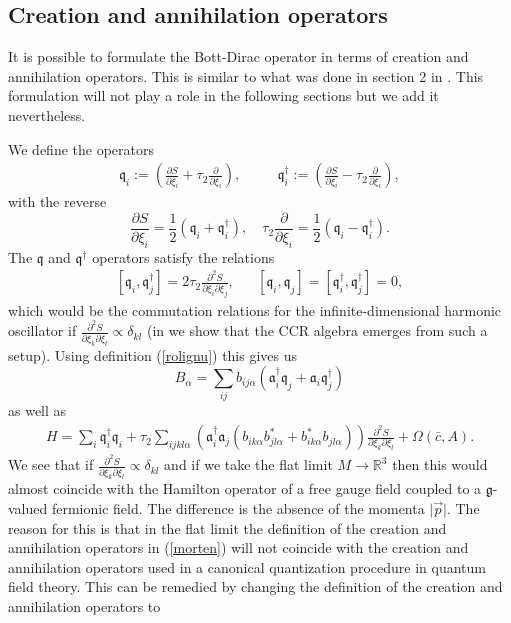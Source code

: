 \documentclass[letterpaper,11pt]{article}
\def\a{\alpha}
\def\d{\delta}
\def\OO{\Omega}
\newcommand{\pa}{\partial}
\begin{document}
\subsection{Creation and annihilation operators}


It is possible to formulate the Bott-Dirac operator in terms of creation and annihilation operators. This is similar to what was done in section 2 in \cite{Aastrup:2017atr}. This formulation will not play a role in the following sections but we add it nevertheless. 

We define the operators 
\begin{eqnarray}
\mathfrak{q}_i := \left( \frac{\pa S}{\pa \xi_i}+ \tau_2  \frac{\pa}{\pa\xi_i}\right)  , &&\quad
\mathfrak{q}_i^\dagger :=  \left( \frac{\pa S}{\pa \xi_i} -\tau_2 \frac{\pa}{\pa\xi_i} \right) ,
\label{morten}
\end{eqnarray}
with the reverse
$$
 \frac{\pa S}{\pa \xi_i} =  \frac{1}{2}  (\mathfrak{q}_i +\mathfrak{q}_i^\dagger ) ,   \quad    \tau_2 \frac{\pa}{\pa\xi_i} =\frac{1}{2}  (\mathfrak{q}_i -\mathfrak{q}_i^\dagger ).
$$
The $\mathfrak{q}$ and $\mathfrak{q}^\dagger$ operators satisfy the relations  
\begin{eqnarray}
\left[\mathfrak{q}_i , \mathfrak{q}_j^\dagger \right] =  {2\tau_2} \frac{\pa^2 S}{\pa\xi_i \pa \xi_j} ,
&&
\left[\mathfrak{q}_i  , \mathfrak{q}_j\right] =  \left[\mathfrak{q}_i^\dagger  , \mathfrak{q}_j^\dagger\right] =   0,
\label{covi}
\end{eqnarray}
which would be the commutation relations for the infinite-dimensional harmonic oscillator if $ \frac{\pa^2 S}{\pa\xi_k \pa \xi_l}\propto \d_{kl}$ (in \cite{Aastrup:2017atr} we show that the CCR algebra emerges from such a setup). 
Using definition (\ref{rolignu}) this gives us
$$
B_\a =  \sum_{ij} b_{ij\a} \left(  \mathfrak{a}_i^\dagger  \mathfrak{q}_j +   \mathfrak{a}_i \mathfrak{q}_j^\dagger   \right)
$$
as well as 
\begin{eqnarray}
H= 
 \sum_{i} \mathfrak{q}_i^\dagger   \mathfrak{q}_i 
 +{\tau_2}\sum_{ijkl\a}  \left( \mathfrak{a}_i^\dagger  \mathfrak{a}_j  \left( b_{ik\a}b^*_{jl\a}  +b^*_{ik\a}b_{jl\a}   \right)    \right) \frac{\pa^2 S}{\pa\xi_k \pa \xi_l} +  \OO(\bar{c}, A)  .
\label{tja}
\end{eqnarray}
We see that if $\frac{\pa^2 S}{\pa\xi_k \pa \xi_l}  \propto \d_{kl}$ and if we take the flat limit $M\rightarrow \mathbb{R}^3$ then this would almost coincide with the Hamilton operator of a free gauge field coupled to a $\mathfrak{g}$-valued fermionic field. The difference is the absence of the momenta $\vert \vec{p} \vert$. The reason for this is that in the flat limit the definition of the creation and annihilation operators in (\ref{morten}) will not coincide with the creation and annihilation operators used in a canonical quantization procedure in quantum field theory. This can be remedied by changing the definition of the creation and annihilation operators to
\end{document}
